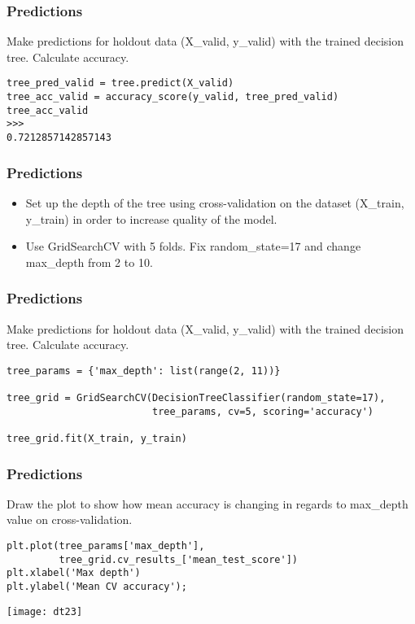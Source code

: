 \begin{frame}[fragile]\frametitle{Predictions}
Make predictions for holdout data (X\_valid, y\_valid) with the trained decision tree. Calculate accuracy.

\begin{lstlisting}
tree_pred_valid = tree.predict(X_valid) 
tree_acc_valid = accuracy_score(y_valid, tree_pred_valid)
tree_acc_valid
>>>
0.7212857142857143
\end{lstlisting}
\end{frame}


\begin{frame}[fragile]\frametitle{Predictions}
\begin{itemize}
\item Set up the depth of the tree using cross-validation on the dataset (X\_train, y\_train) in order to increase quality of the model. 
\item Use GridSearchCV with 5 folds. Fix random\_state=17 and change  max\_depth from 2 to 10.
\end{itemize}
\end{frame}

\begin{frame}[fragile]\frametitle{Predictions}
Make predictions for holdout data (X\_valid, y\_valid) with the trained decision tree. Calculate accuracy.

\begin{lstlisting}
tree_params = {'max_depth': list(range(2, 11))}

tree_grid = GridSearchCV(DecisionTreeClassifier(random_state=17), 
                         tree_params, cv=5, scoring='accuracy') 

tree_grid.fit(X_train, y_train)
\end{lstlisting}
\end{frame}


\begin{frame}[fragile]\frametitle{Predictions}
Draw the plot to show how mean accuracy is changing in regards to max\_depth value on cross-validation.
\begin{lstlisting}
plt.plot(tree_params['max_depth'], 
         tree_grid.cv_results_['mean_test_score'])
plt.xlabel('Max depth')
plt.ylabel('Mean CV accuracy');
\end{lstlisting}
\begin{center}
\texttt{[image: dt23]}
\end{center}
\end{frame}



